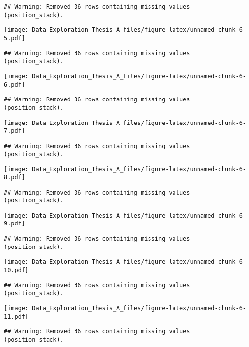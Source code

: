 \documentclass[]{article}
\begin{document}
\begin{verbatim}
## Warning: Removed 36 rows containing missing values (position_stack).
\end{verbatim}

\texttt{[image: Data\_Exploration\_Thesis\_A\_files/figure-latex/unnamed-chunk-6-5.pdf]}

\begin{verbatim}
## Warning: Removed 36 rows containing missing values (position_stack).
\end{verbatim}

\texttt{[image: Data\_Exploration\_Thesis\_A\_files/figure-latex/unnamed-chunk-6-6.pdf]}

\begin{verbatim}
## Warning: Removed 36 rows containing missing values (position_stack).
\end{verbatim}

\texttt{[image: Data\_Exploration\_Thesis\_A\_files/figure-latex/unnamed-chunk-6-7.pdf]}

\begin{verbatim}
## Warning: Removed 36 rows containing missing values (position_stack).
\end{verbatim}

\texttt{[image: Data\_Exploration\_Thesis\_A\_files/figure-latex/unnamed-chunk-6-8.pdf]}

\begin{verbatim}
## Warning: Removed 36 rows containing missing values (position_stack).
\end{verbatim}

\texttt{[image: Data\_Exploration\_Thesis\_A\_files/figure-latex/unnamed-chunk-6-9.pdf]}

\begin{verbatim}
## Warning: Removed 36 rows containing missing values (position_stack).
\end{verbatim}

\texttt{[image: Data\_Exploration\_Thesis\_A\_files/figure-latex/unnamed-chunk-6-10.pdf]}

\begin{verbatim}
## Warning: Removed 36 rows containing missing values (position_stack).
\end{verbatim}

\texttt{[image: Data\_Exploration\_Thesis\_A\_files/figure-latex/unnamed-chunk-6-11.pdf]}

\begin{verbatim}
## Warning: Removed 36 rows containing missing values (position_stack).
\end{verbatim}
\end{document}
